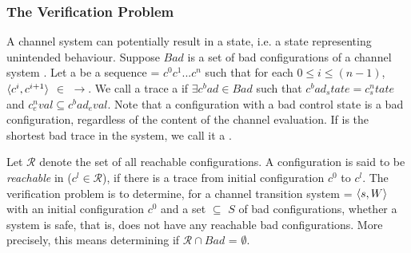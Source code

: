 \subsubsection{The Verification Problem}
A channel system can potentially result in a  state, i.e. a state representing unintended behaviour. Suppose $Bad$ is a set of bad configurations of a channel system . Let a  be a sequence  = $c^0c^1...c^n$ such that for each $0 \leq i \leq (n-1)$, $\langle c^i,c^{i+1}\rangle$ $\in$ $\rightarrow$. We call a trace a  if $\exists c^bad \in Bad$ such that $c^bad_state = c^n_state$ and $c^n_eval \subseteq c^bad_eval$. Note that a configuration with a bad control state is a bad configuration, regardless of the content of the channel evaluation. If  is the shortest bad trace in the system, we call it a .

Let $\mathcal{R}$ denote the set of all reachable configurations. A configuration  is said to be \emph{reachable} in  ($c^l \in \mathcal{R}$), if there is a trace from initial configuration $c^0$ to $c^l$. The verification problem is to determine, for a channel transition system  = $\langle s,W\rangle$ with an initial configuration $c^0$ and a set  $\subseteq$ $S$ of bad configurations, whether a system is safe, that is, does not have any reachable bad configurations. More precisely, this means determining if $\mathcal{R} \cap Bad$  = $\emptyset$.







